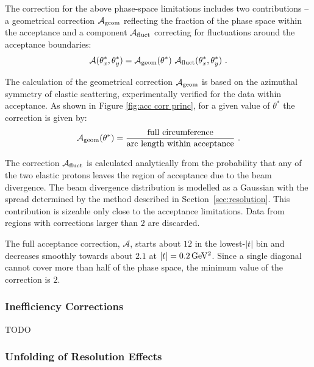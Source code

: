 The correction for the above phase-space limitations includes two contributions -- a geometrical correction $\mathcal{A}_{\rm geom}$ reflecting the fraction of the phase space within the acceptance and a component $\mathcal{A}_{\rm fluct}$ correcting for fluctuations around the acceptance boundaries:
\begin{equation}
\mathcal{A}(\theta^*_x, \theta_y^*) = \mathcal{A}_{\rm geom}(\theta^*)\ \mathcal{A}_{\rm fluct}(\theta^*_x, \theta_y^*)\ .
\end{equation}

The calculation of the geometrical correction $\mathcal{A}_{\rm geom}$ is based on the azimuthal symmetry of elastic scattering, experimentally verified for the data within acceptance. As shown in Figure \ref{fig:acc corr princ}, for a given value of $\theta^*$ the correction is given by:
\begin{equation}
\label{eq:acc geom}
\mathcal{A_{\rm geom}}(\theta^*) = {
	\hbox{full circumference}\over 
	\hbox{arc length within acceptance}
} \ .
\end{equation}

The correction $\mathcal{A}_{\rm fluct}$ is calculated analytically from the probability that any of the two elastic protons leaves the region of acceptance due to the beam divergence. The beam divergence distribution is modelled as a Gaussian with the spread determined by the method described in Section~\ref{sec:resolution}. This contribution is sizeable only close to the acceptance limitations. Data from regions with corrections larger than $2$ are discarded.

The full acceptance correction, $\mathcal{A}$, starts about $12$ in the lowest-$|t|$ bin and decreases smoothly towards about $2.1$ at $|t| = 0.2\,{\rm GeV^2}$. Since a single diagonal cannot cover more than half of the phase space, the minimum value of the correction is $2$.




\subsubsection{Inefficiency Corrections}
\label{sec:ineff corr}

TODO


\subsubsection{Unfolding of Resolution Effects}
\label{sec:unfolding}

